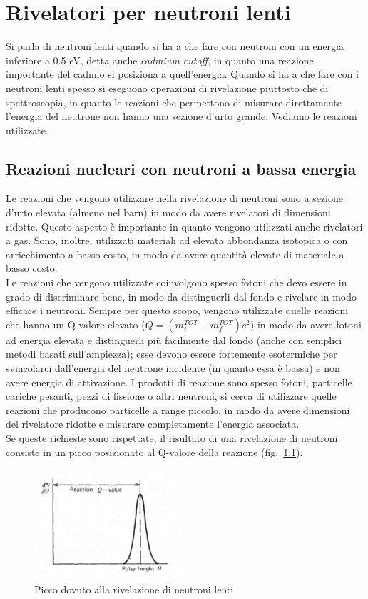 \chapter{Rivelatori per neutroni lenti}
Si parla di neutroni lenti quando si ha a che fare con neutroni con un energia inferiore a 0.5 eV, detta anche \textit{cadmium cutoff}, in quanto
una reazione importante del cadmio si posiziona a quell'energia.
Quando si ha a che fare con i neutroni lenti spesso si eseguono operazioni di rivelazione piuttosto che di spettroscopia, in quanto le reazioni
che permettono di misurare direttamente l'energia del neutrone non hanno una sezione d'urto grande.
Vediamo le reazioni utilizzate.
\section{Reazioni nucleari con neutroni a bassa energia}
Le reazioni che vengono utilizzare nella rivelazione di neutroni sono a sezione d'urto elevata (almeno nel barn) in modo da avere rivelatori
di dimensioni ridotte.
Questo aspetto  \`e importante in quanto vengono utilizzati anche rivelatori a gas.
Sono, inoltre, utilizzati materiali ad elevata abbondanza isotopica o con arricchimento a basso costo, in modo da avere quantit\`a elevate di materiale
a basso costo.\\
Le reazioni che vengono utilizzate coinvolgono spesso fotoni che devo essere in grado di discriminare bene, in modo da distinguerli dal fondo e rivelare
in modo efficace i neutroni.
Sempre per questo scopo, vengono utilizzate quelle reazioni che hanno un Q-valore elevato ($Q=(m_i^{TOT}-m_f^{TOT})c^2$) in modo da avere fotoni ad energia
elevata e distinguerli pi\`u facilmente dal fondo (anche con semplici metodi basati sull'ampiezza); esse devono essere fortemente esotermiche
per svincolarci dall'energia del neutrone incidente (in quanto essa \`e bassa) e non avere energia di attivazione.
I prodotti di reazione sono spesso fotoni, particelle cariche pesanti, pezzi di fissione o altri neutroni, si cerca di utilizzare
quelle reazioni che producono particelle a range piccolo, in modo da avere dimensioni del rivelatore ridotte e misurare completamente l'energia
associata.\\
Se queste richieste sono rispettate, il risultato di una rivelazione di neutroni consiste in un picco posizionato al Q-valore della reazione
(fig.~\ref{fig:piccoNeutroni}).
\begin{figure}[htbp]
\begin{center}
	\includegraphics[scale=1]{./Immagini/PiccoNeutroni.png}
\caption{Picco dovuto alla rivelazione di neutroni lenti}
\label{fig:piccoNeutroni}
\end{center}
\end{figure}
